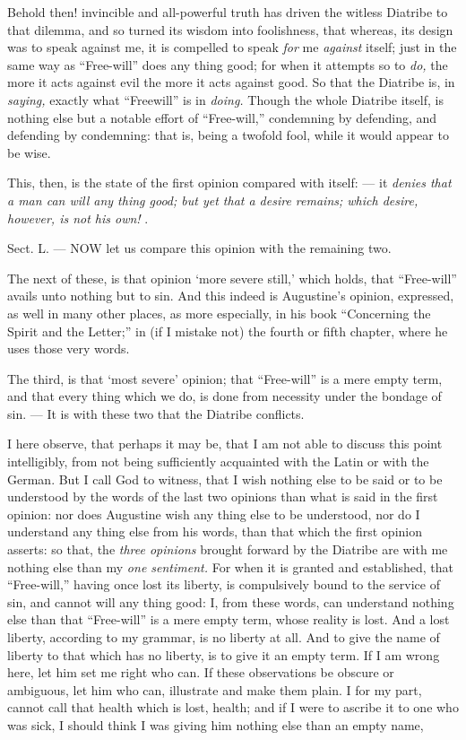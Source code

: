 Behold then! invincible and all-powerful truth has driven the witless Diatribe to that dilemma, and so turned its wisdom into foolishness, that whereas, its design was to speak against me, it is compelled to speak \emph{for }me \emph{against }itself; just in the same way as “Free-will” does any thing good; for when it attempts so to \emph{do, }the more it acts against evil the more it acts against good. So that the Diatribe is, in \emph{saying, }exactly what “Freewill” is in \emph{doing. }Though the whole Diatribe itself, is nothing else but a notable effort of “Free-will,” condemning by defending, and defending by condemning: that is, being a twofold fool, while it would appear to be wise.

This, then, is the state of the first opinion compared with itself: — it \emph{denies that a man can will any thing good; but yet that a desire remains; which desire, however, is not his own!} .


Sect. L. — NOW let us compare this opinion with the remaining two.

The next of these, is that opinion ‘more severe still,’ which holds, that “Free-will” avails unto nothing but to sin. And this indeed is Augustine’s opinion, expressed, as well in many other places, as more especially, in his book “Concerning the Spirit and the Letter;” in (if I mistake not) the fourth or fifth chapter, where he uses those very words.

The third, is that ‘most severe’ opinion; that “Free-will” is a mere empty term, and that every thing which we do, is done from necessity under the bondage of sin. — It is with these two that the Diatribe conflicts.

I here observe, that perhaps it may be, that I am not able to discuss this point intelligibly, from not being sufficiently acquainted with the Latin or with the German. But I call God to witness, that I wish nothing else to be said or to be understood by the words of the last two opinions than what is said in the first opinion: nor does Augustine wish any thing else to be understood, nor do I understand any thing else from his words, than that which the first opinion asserts: so that, the \emph{three opinions }brought forward by the Diatribe are with me nothing else than my \emph{one sentiment. }For when it is granted and established, that “Free-will,” having once lost its liberty, is compulsively bound to the service of sin, and cannot will any thing good: I, from these words, can understand nothing else than that “Free-will” is a mere empty term, whose reality is lost. And a lost liberty, according to my grammar, is no liberty at all. And to give the name of liberty to that which has no liberty, is to give it an empty term. If I am wrong here, let him set me right who can. If these observations be obscure or ambiguous, let him who can, illustrate and make them plain. I for my part, cannot call that health which is lost, health; and if I were to ascribe it to one who was sick, I should think I was giving him nothing else than an empty name,

